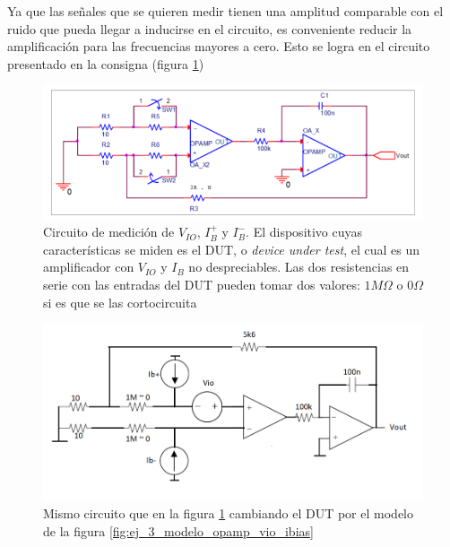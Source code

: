 \documentclass[../../main.tex]{subfiles}
\begin{document}
Ya que las se\~nales que se quieren medir tienen una amplitud comparable con el ruido que pueda llegar a inducirse en el circuito, es conveniente reducir la amplificaci\'on para las frecuencias mayores a cero.  Esto se logra en el circuito presentado en la consigna (figura \ref{fig:ej_3_medicion_vio_consigna})

\begin{figure}[htbp] %
	\centering
	\includegraphics[scale=1]{imagenes/medicion_bias_configuracion_consigna.png}
	\caption{Circuito de medici\'on de $V_{IO}$, $I_B^+$ y $I_B^-$. El dispositivo cuyas caracter\'isticas se miden es el DUT, o \textit{device under test}, el cual es un amplificador con $V_{IO}$ y $I_B$ no despreciables. Las dos resistencias en serie con las entradas del DUT pueden tomar dos valores: $1M\Omega$ o $0\Omega$ si es que se las cortocircuita}
	\label{fig:ej_3_medicion_vio_consigna}
\end{figure}
\begin{figure}[htbp] %
	\centering
	\includegraphics[scale=1]{imagenes/medicion_bias_configuracion_consigna_dos.png}
	\caption{Mismo circuito que en la figura \ref{fig:ej_3_medicion_vio_consigna} cambiando el DUT por el modelo de la figura \ref{fig:ej_3_modelo_opamp_vio_ibias}}
	\label{fig:ej_3_medicion_vio_consigna_modelando}
\end{figure}
\end{document}
